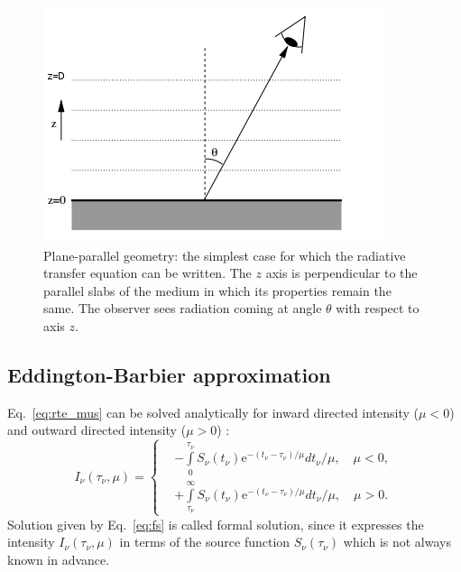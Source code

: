 \documentclass[paper=a4, fontsize=11pt]{article}
\numberwithin{equation}{section}
\numberwithin{figure}{section}
\numberwithin{table}{section}
\begin{document}
\begin{figure}
\centering
\includegraphics[scale=1.1]{ppa_corr}
\caption[Plane-parallel geometry]{
         Plane-parallel geometry: the simplest case for which the radiative transfer equation can be written.
         The $z$ axis is perpendicular to the parallel slabs of the medium in which its properties remain the same.
         The observer sees radiation coming at angle $\theta$ with respect to axis $z$.
        }
\label{fig:ppa}
\end{figure}

\subsection{Eddington-Barbier approximation}\label{sect:eba}
Eq.~\eqref{eq:rte_mus} can be solved analytically for inward directed intensity ($\mu < 0$)
and outward directed intensity ($\mu > 0$) \cite[p. 17]{rutten2003}:
\begin{equation}\label{eq:fs}
I_\nu(\tau_\nu, \mu) =
\begin{cases}
&-\int\limits_0^{\tau_\nu}S_\nu(t_\nu)\mbox{e}^{-(t_\nu - \tau_\nu) / \mu}dt_\nu / \mu, \quad \mu < 0,\\
&+\int\limits_{\tau_\nu}^\infty S_\nu(t_\nu)\mbox{e}^{-(t_\nu - \tau_\nu) / \mu}dt_\nu / \mu, \quad \mu > 0.
\end{cases}
\end{equation}
Solution given by Eq.~\eqref{eq:fs} is called formal solution, since it expresses the intensity $I_\nu(\tau_\nu, \mu)$ in terms of the
source function $S_\nu(\tau_\nu)$ which is not always known in advance.
\end{document}
